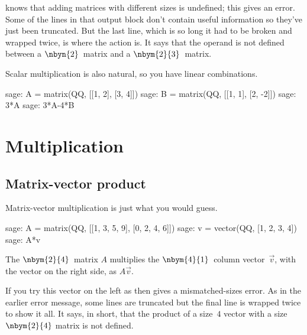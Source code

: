 \Sage{} knows that adding matrices with different sizes is undefined; 
this gives an error. 
\noindent
Some of the lines in that output block don't contain useful information so 
they've just been truncated.
But the last line, which is so long it had to be broken and wrapped 
twice, is where the action is.
It says that the \inlinecode{+} operand is not defined between a
$\nbyn{2}$~matrix and a $\nbym{2}{3}$~matrix.

Scalar multiplication is also natural,
so you have linear combinations.
\begin{sagecommandline}[d,0,2]
sage: A = matrix(QQ, [[1, 2], [3, 4]])
sage: B = matrix(QQ, [[1, 1], [2, -2]])
sage: 3*A
sage: 3*A-4*B
\end{sagecommandline}



\section{Multiplication}

\subsection{Matrix-vector product}
Matrix-vector multiplication is just what you would guess.
\begin{sagecommandline}
sage: A = matrix(QQ, [[1, 3, 5, 9], [0, 2, 4, 6]])
sage: v = vector(QQ, [1, 2, 3, 4])
sage: A*v
\end{sagecommandline}
\noindent
The $\nbym{2}{4}$~matrix $A$ multiplies the 
$\nbym{4}{1}$~column vector~$\vec{v}$, with the vector on the right side,
as $A\vec{v}$.

If you try this vector on the left as 
 then \Sage{} gives a mismatched-sizes error.
\noindent
As in the earlier error message, 
some lines are truncated but the final line is wrapped 
twice to show it all.
It says, in short, that the product of a size~$4$ vector with
a size~$\nbym{2}{4}$ matrix is not defined.


